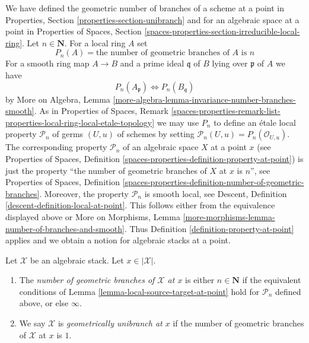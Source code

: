 \noindent
We have defined the geometric number of branches of a scheme at a point
in Properties, Section \ref{properties-section-unibranch}
and for an algebraic space at a point in Properties of Spaces, Section
\ref{spaces-properties-section-irreducible-local-ring}.
Let $n \in \mathbf{N}$. For a local ring $A$ set
$$
P_n(A) = \text{the number of geometric branches of }A\text{ is }n
$$
For a smooth ring map $A \to B$ and a prime ideal $\mathfrak q$
of $B$ lying over $\mathfrak p$ of $A$ we have
$$
P_n(A_\mathfrak p) \Leftrightarrow P_n(B_\mathfrak q)
$$
by More on Algebra, Lemma
\ref{more-algebra-lemma-invariance-number-branches-smooth}.
As in Properties of Spaces, Remark
\ref{spaces-properties-remark-list-properties-local-ring-local-etale-topology}
we may use $P_n$ to define an \'etale local property $\mathcal{P}_n$
of germs $(U, u)$ of schemes by setting
$\mathcal{P}_n(U, u) = P_n(\mathcal{O}_{U, u})$.
The corresponding property $\mathcal{P}_n$
of an algebraic space $X$ at a point $x$
(see Properties of Spaces, Definition
\ref{spaces-properties-definition-property-at-point})
is just the property
``the number of geometric branches of $X$ at $x$ is $n$'', see
Properties of Spaces, Definition
\ref{spaces-properties-definition-number-of-geometric-branches}.
Moreover, the property $\mathcal{P}_n$ is smooth local, see
Descent, Definition \ref{descent-definition-local-at-point}.
This follows either from the equivalence displayed above
or More on Morphisms, Lemma
\ref{more-morphisms-lemma-number-of-branches-and-smooth}.
Thus Definition \ref{definition-property-at-point}
applies and we obtain a notion for algebraic stacks at a point.

\begin{definition}
\label{definition-number-of-geometric-branches}
Let $\mathcal{X}$ be an algebraic stack. Let $x \in |\mathcal{X}|$.
\begin{enumerate}
\item The {\it number of geometric branches of $\mathcal{X}$ at $x$}
is either $n \in \mathbf{N}$ if the equivalent conditions of
Lemma \ref{lemma-local-source-target-at-point} hold for
$\mathcal{P}_n$ defined above, or else $\infty$.
\item We say $\mathcal{X}$ is {\it geometrically unibranch at $x$}
if the number of geometric branches of $\mathcal{X}$ at $x$ is $1$.
\end{enumerate}
\end{definition}






